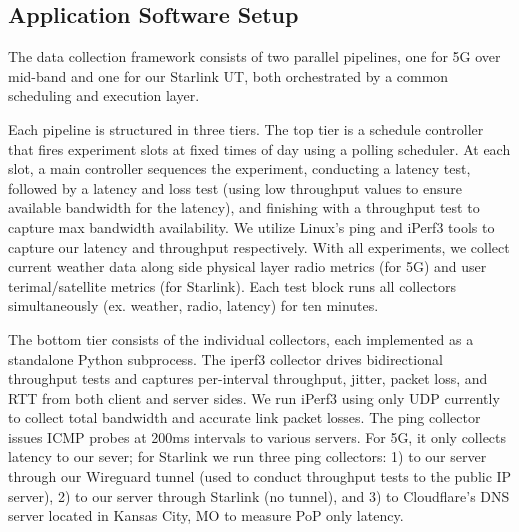 \documentclass[12pt]{article}
\begin{document}
\begin{table}[htpb]
    \centering
    \caption{Starlink and OneWeb LEO Satellite Network (LSN) comparison}
    \label{tab:lsns}
\end{table}

\subsection{Application Software Setup}

The data collection framework consists of two parallel pipelines, one for 5G over mid-band and one for our Starlink UT, both orchestrated by a common scheduling and execution layer.

Each pipeline is structured in three tiers. The top tier is a schedule controller that fires experiment slots at fixed times of day using a polling scheduler. At each slot, a main controller sequences the experiment, conducting a latency test, followed by a latency and loss test (using low throughput values to ensure available bandwidth for the latency), and finishing with a throughput test to capture max bandwidth availability. We utilize Linux's ping and iPerf3 tools to capture our latency and throughput respectively. With all experiments, we collect current weather data along side physical layer radio metrics (for 5G) and user terimal/satellite metrics (for Starlink). Each test block runs all collectors simultaneously (ex. weather, radio, latency) for ten minutes.

The bottom tier consists of the individual collectors, each implemented as a standalone Python subprocess. The iperf3 collector drives bidirectional throughput tests and captures per-interval throughput, jitter, packet loss, and RTT from both client and server sides. We run iPerf3 using only UDP currently to collect total bandwidth and accurate link packet losses. The ping collector issues ICMP probes at 200ms intervals to various servers. For 5G, it only collects latency to our sever; for Starlink we run three ping collectors: 1) to our server through our Wireguard tunnel (used to conduct throughput tests to the public IP server), 2) to our server through Starlink (no tunnel), and 3) to Cloudflare's DNS server located in Kansas City, MO to measure PoP only latency. 
\end{document}
